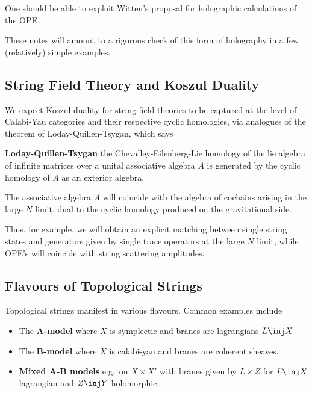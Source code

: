 \documentclass[12pt]{amsart}
\begin{document}
  \begin{rmk}
    One should be able to exploit Witten's proposal for holographic
    calculations of the OPE.
  \end{rmk}

  These notes will amount to a rigorous check of this form of holography in a
  few (relatively) simple examples.

\subsection{String Field Theory and Koszul Duality}
  We expect Koszul duality for string field theories to be captured at the
  level of Calabi-Yau categories and their respective cyclic homologies, via
  analogues of
  the theorem of Loday-Quillen-Tsygan, which says
  \begin{thm}
    \textbf{Loday-Quillen-Tsygan} the Chevalley-Eilenberg-Lie homology of the
    lie algebra of infinite matrices over a unital associative algebra $A$ is
    generated by the cyclic homology of $A$ as an exterior algebra.
  \end{thm}

  The associative algebra $A$ will coincide with the algebra of cochains arising in the
  large $N$ limit, dual to the cyclic homology produced on the gravitational
  side.\par

  Thus, for example, we will obtain an explicit matching between single string states and
  generators given by single trace operators\footnotemark{} at the large $N$ limit, while OPE's will coincide with
  string scattering amplitudes.

\subsection{Flavours of Topological Strings}
Topological strings manifest in various flavours. Common examples include

\begin{itemize}
  \item The \textbf{A-model} where $X$ is symplectic and branes are
    lagrangians $L \inj X$
  \item The \textbf{B-model} where $X$ is calabi-yau and branes are coherent
    sheaves.
  \item \textbf{Mixed A-B models} e.g.\ on $X \times X'$ with branes given by
    $L\times Z$ for $L \inj X$ lagrangian and $Z \inj Y$ holomorphic.
\end{itemize}
\end{document}
